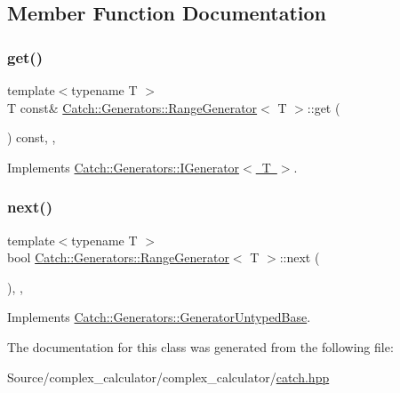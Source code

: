 \subsection{Member Function Documentation}
\mbox{\label{class_catch_1_1_generators_1_1_range_generator_a2639173bb9f06ba353314cd226fcefec}} 
\subsubsection{\texorpdfstring{get()}{get()}}
{\footnotesize\ttfamily template$<$typename T $>$ \\
T const\& \mbox{\hyperlink{class_catch_1_1_generators_1_1_range_generator}{Catch\+::\+Generators\+::\+Range\+Generator}}$<$ T $>$\+::get (\begin{DoxyParamCaption}{ }\end{DoxyParamCaption}) const\hspace{0.3cm}{\ttfamily [inline]}, {\ttfamily [override]}, {\ttfamily [virtual]}}



Implements \mbox{\hyperlink{struct_catch_1_1_generators_1_1_i_generator_a525d381fc9249a885b075a0632a8579a}{Catch\+::\+Generators\+::\+I\+Generator$<$ T $>$}}.

\mbox{\label{class_catch_1_1_generators_1_1_range_generator_a4e6b2038832f09724d5a4355b4691259}} 
\subsubsection{\texorpdfstring{next()}{next()}}
{\footnotesize\ttfamily template$<$typename T $>$ \\
bool \mbox{\hyperlink{class_catch_1_1_generators_1_1_range_generator}{Catch\+::\+Generators\+::\+Range\+Generator}}$<$ T $>$\+::next (\begin{DoxyParamCaption}{ }\end{DoxyParamCaption})\hspace{0.3cm}{\ttfamily [inline]}, {\ttfamily [override]}, {\ttfamily [virtual]}}



Implements \mbox{\hyperlink{class_catch_1_1_generators_1_1_generator_untyped_base_aeed3c0cd6233c5f553549e453b8d6638}{Catch\+::\+Generators\+::\+Generator\+Untyped\+Base}}.



The documentation for this class was generated from the following file\+:\begin{DoxyCompactItemize}
\item 
Source/complex\+\_\+calculator/complex\+\_\+calculator/\mbox{\hyperlink{catch_8hpp}{catch.\+hpp}}\end{DoxyCompactItemize}
